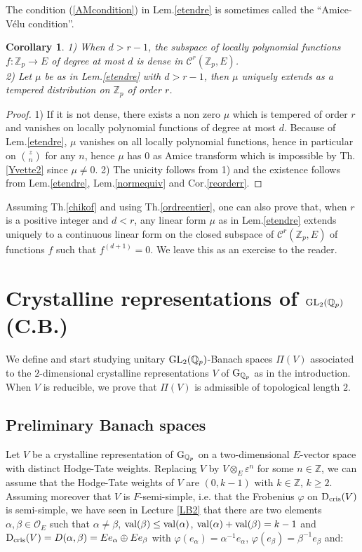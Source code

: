 \documentclass[11pt]{amsart}
\def\Z{{\mathbb Z}_p}
\def\Q{{\mathbb Q}_p}
\def\g{{\rm G}_{\Q}}
\def\G{{\rm GL}_2(\Q)}
\def\O{{\mathcal O}_E}
\newtheorem{cor}[definit]{\bf{Corollary}}
\begin{document}
The condition (\ref{AMcondition}) in Lem.\ref{etendre} is sometimes
called the ``Amice-V\'elu condition''.  
 
\begin{cor}\label{travail} 
1) When $d>r-1$, the subspace of locally polynomial functions
$f:\Z\rightarrow E$ of degree at most $d$ is dense in ${\mathcal
  C}^r(\Z,E)$.\\  
2) Let $\mu$ be as in Lem.\ref{etendre} with $d>r-1$, then $\mu$
uniquely extends as a tempered distribution on $\Z$ of order $r$.  
\end{cor} 
\begin{proof} 
1) If it is not dense, there exists a non zero $\mu$ which is tempered
   of order $r$ and vanishes on locally polynomial functions of degree
   at most $d$. Because of Lem.\ref{etendre}, $\mu$ vanishes on all
   locally polynomial functions, hence in particular on ${z\choose n}$
   for any $n$, hence $\mu$ has $0$ as Amice transform which is
   impossible by Th.\ref{Yvette2} since $\mu\ne 0$. 2) The unicity
   follows from 1) and the existence follows from Lem.\ref{etendre},
   Lem.\ref{normequiv} and Cor.\ref{reorderr}.  
\end{proof} 
 
Assuming Th.\ref{chikof} and using Th.\ref{ordreentier}, one can also
prove that, when $r$ is a positive integer and $d<r$, any linear form
$\mu$ as in Lem.\ref{etendre} extends uniquely to a continuous linear
form on the closed subspace of ${\mathcal C}^r(\Z,E)$ of functions $f$
such that $f^{(d+1)}=0$. We leave this as an exercise to the reader.  
 
 
\section{Crystalline representations of $\G$ (C.B.)} 
We define and start studying unitary $\G$-Banach spaces $\Pi(V)$
associated to the $2$-dimen\-sional crystalline representations $V$ of
$\g$ as in the introduction. When $V$ is reducible, we prove that
$\Pi(V)$ is admissible of topological length $2$.  
 
\subsection{Preliminary Banach spaces}\label{banachdebut} 
 Let $V$ be a crystalline representation of $\g$ on a two-dimensional
$E$-vector space with distinct Hodge-Tate weights. Replacing $V$ by
$V\otimes_E\varepsilon^n$ for some $n\in {\mathbb Z}$, we can assume
that the Hodge-Tate weights of $V$ are $(0,k-1)$ with $k\in {\mathbb
  Z}$, $k\geq 2$. Assuming moreover that $V$ is $F$-semi-simple,
i.e. that the Frobenius $\varphi$ on ${\rm D}_{\rm cris}(V)$ is
semi-simple, we have seen in Lecture \ref{LB2} that there are two
elements $\alpha,\beta\in \O$ such that $\alpha\ne \beta$, ${\rm
  val}(\beta)\leq {\rm val}(\alpha)$, ${\rm val}(\alpha)+{\rm
  val}(\beta)=k-1$ and ${\rm D}_{\rm
  cris}(V)=D(\alpha,\beta)=Ee_{\alpha}\oplus Ee_{\beta}$ with
$\varphi(e_{\alpha})=\alpha^{-1}e_{\alpha}$,
$\varphi(e_{\beta})=\beta^{-1}e_{\beta}$ and:\\
\end{document}
